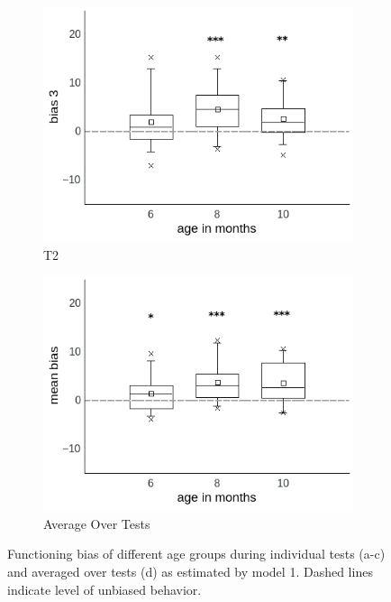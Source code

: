 \documentclass[a4paper]{scrreprt}
\begin{document}
\begin{figure}
    \begin{subfigure}[b]{0.49\textwidth}
        \includegraphics[width=\textwidth]{figs/sec3/age/age_diff3_mod1.jpeg}
        \caption{T2}
    \end{subfigure}
    \begin{subfigure}[b]{0.49\textwidth}
        \includegraphics[width=\textwidth]{figs/sec3/age/age_diff_mean_mod1.jpeg}
        \caption{Average Over Tests}
    \end{subfigure}
\caption{Functioning bias of different age groups during individual tests (a-c) and averaged over tests (d) as estimated by model 1. Dashed lines indicate level of unbiased behavior.}
\label{fig:age_diff_mod1}
\end{figure}
\end{document}
